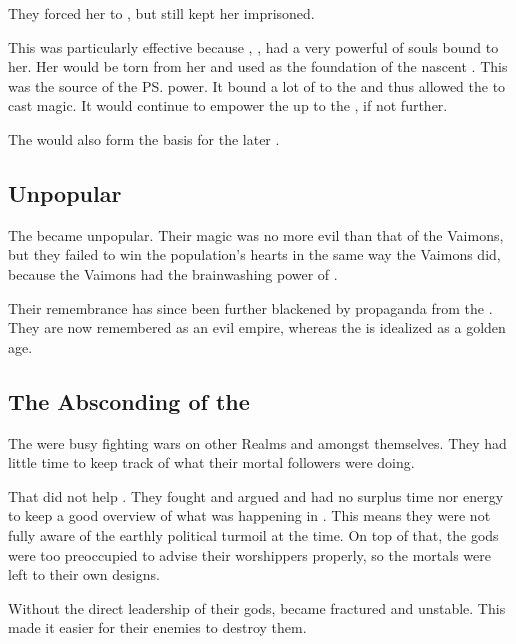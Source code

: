 They forced her to , but still kept her imprisoned. 

This was particularly effective because \Ishicah{}, , had a very powerful \carcer{} of souls bound to her. 
Her \carcer{} would be torn from her and used as the foundation of the nascent \Ortaican{} \matrix. 
This \matrix{} was the source of the \ps{\rethyaxes} power. 
It bound a lot of \daemons{} to the \Taorthae{} and thus allowed the \rethyaxes{} to cast magic. 
It would continue to empower the \rethyaxes{} up to the , if not further.

The \Ortaican{} \matrix{} would also form the basis for the later . 





\subsection{Unpopular}
The \Ortaican{} \baccons{} became unpopular. 
Their magic was no more evil than that of the Vaimons, but they failed to win the population's hearts in the same way the Vaimons did, because the Vaimons had the brainwashing power of \Iquin. 

Their remembrance has since been further blackened by propaganda from the  . 
They are now remembered as an evil empire, whereas the \VaimonCaliphate is idealized as a golden age. 





\subsection{The Absconding of the \Taorthae}
The \taorthae were busy fighting wars on other Realms and amongst themselves.
They had little time to keep track of what their mortal followers were doing. 

That did not help \Ortaica. 
They fought and argued and had no surplus time nor energy to keep a good overview of what was happening in \Ortaica. 
This means they were not fully aware of the earthly political turmoil at the time. 
On top of that, the gods were too preoccupied to advise their worshippers properly, so the mortals were left to their own designs. 

Without the direct leadership of their gods, \Ortaica became fractured and unstable. 
This made it easier for their enemies to destroy them. 

